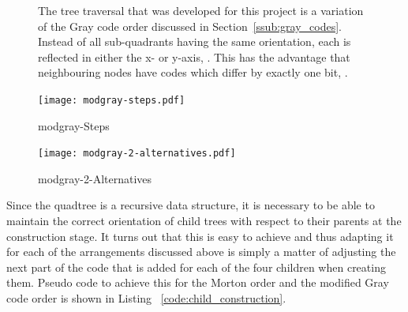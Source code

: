 \begin{figure}[tbhp]
\begin{subfigure}[c]{4.6cm}
        \caption{}\label{fig:modgray-2-levels-numbers.pdf}
    \end{subfigure}
    \caption{The tree traversal that was developed for this project is a
    	variation of the Gray code order discussed in
    	Section~\ref{ssub:gray_codes}.  Instead of all sub-quadrants having the
    	same orientation, each is reflected in either the x- or y-axis,
    	. This has the advantage that
		neighbouring nodes have codes which differ by exactly one bit,
		.} \label{fig:modgray-traversal}
\end{figure}

\begin{figure}[tbhp]
	\centering
	\texttt{[image: modgray-steps.pdf]}
	\caption{modgray-Steps}
	\label{fig:modgray-steps}
\end{figure}

\begin{figure}[tbhp]
	\centering
	\texttt{[image: modgray-2-alternatives.pdf]}
	\caption{modgray-2-Alternatives}
	\label{fig:modgray-2-alternatives}
\end{figure}

Since the quadtree is a recursive data structure, it is necessary to be able
to maintain the correct orientation of child trees with respect to their
parents at the construction stage. It turns out that this is easy to achieve
and thus adapting it for each of the arrangements discussed above is simply a
matter of adjusting the next part of the code that is added for each of the
four children when creating them. Pseudo code to achieve this for the Morton
order and the modified Gray code order is shown in Listing
~\ref{code:child_construction}.


